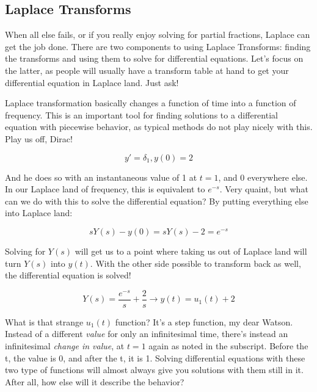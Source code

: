 \documentclass[10pt]{extarticle}
\begin{document}
\begin{multicols}{2}
\subsection{Laplace Transforms}

When all else fails, or if you really enjoy solving for partial fractions,
Laplace can get the job done. There are two components to using Laplace
Transforms: finding the transforms and using them to solve for differential
equations. Let's focus on the latter, as people will usually have a transform
table at hand to get your differential equation in Laplace land. Just ask!

Laplace transformation basically changes a function of time into a function of
frequency. This is an important tool for finding solutions to a differential
equation with piecewise behavior, as typical methods do not play nicely with
this. Play us off, Dirac!

\begin{equation*}
    y' = \delta_{1}, y(0) = 2
\end{equation*}

And he does so with an instantaneous value of 1 at \(t = 1\), and 0 everywhere
else. In our Laplace land of frequency, this is equivalent to \(e^{-s}\).
Very quaint, but what can we do with this to solve the differential equation?
By putting everything else into Laplace land:

\begin{equation*}
    sY(s) - y(0) = sY(s) - 2 = e^{-s}
\end{equation*}

Solving for \(Y(s)\) will get us to a point where taking us out of Laplace land
will turn \(Y(s)\) into \(y(t)\). With the other side possible to transform
back as well, the differential equation is solved!

\begin{equation*}
    Y(s) = \dfrac{e^{-s}}{s} + \dfrac{2}{s} \rightarrow  y(t) = u_1(t) + 2
\end{equation*}

What is that strange \(u_1(t)\) function? It's a step function, my dear Watson.
Instead of a different {\em value} for only an infinitesimal time, there's
instead an infinitesimal {\em change in value}, at \(t = 1\) again as noted in
the subscript. Before the t, the value is 0, and after the t, it is 1. Solving
differential equations with these two type of functions will almost always give
you solutions with them still in it. After all, how else will it describe the
behavior? 



\end{multicols}
\end{document}
